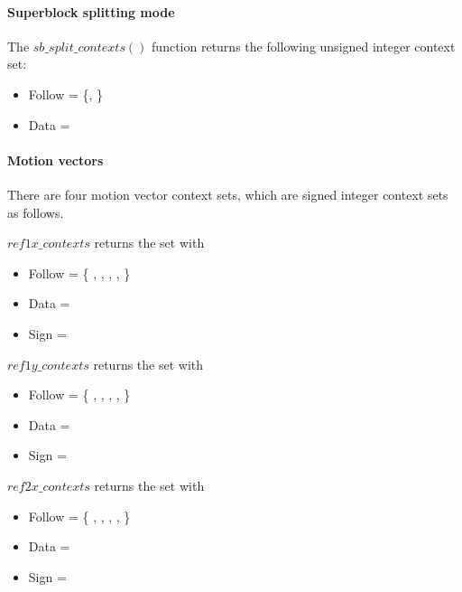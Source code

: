 \paragraph{Superblock splitting mode\\}

The $sb\_split\_contexts()$ function returns the following unsigned integer context set:

\begin{itemize}
\item Follow = \{\SBSplitFollowOne, \SBSplitFollowTwo\}
\item Data = \SBSplitData
\end{itemize}

\paragraph{Motion vectors\\}
\label{mvcontexts}

There are four motion vector context sets, which are signed integer context sets as follows.

$ref1x\_contexts$ returns the set with
\begin{itemize}
\item Follow = \{ \RefOnexFollowOne, \RefOnexFollowTwo, \RefOnexFollowThree, \RefOnexFollowFour, \RefOnexFollowFivePlus \}
\item Data = \RefOnexData
\item Sign = \RefOnexSign
\end{itemize}

$ref1y\_contexts$ returns the set with
\begin{itemize}
\item Follow = \{ \RefOneyFollowOne, \RefOneyFollowTwo, \RefOneyFollowThree, \RefOneyFollowFour, \RefOneyFollowFivePlus \}
\item Data = \RefOneyData
\item Sign = \RefOneySign
\end{itemize}

$ref2x\_contexts$ returns the set with
\begin{itemize}
\item Follow = \{ \RefTwoxFollowOne, \RefTwoxFollowTwo, \RefTwoxFollowThree, \RefTwoxFollowFour, \RefTwoxFollowFivePlus \}
\item Data = \RefTwoxData
\item Sign = \RefTwoxSign
\end{itemize}

